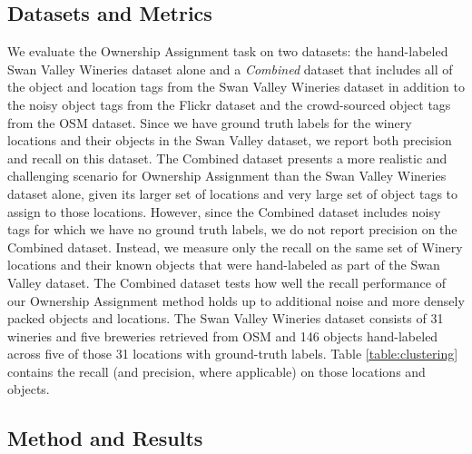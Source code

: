 \subsection{Datasets and Metrics}

We evaluate the Ownership Assignment task on two datasets: the hand-labeled Swan Valley Wineries dataset alone and a \textit{Combined} dataset that includes all of the object and location tags from the Swan Valley Wineries dataset in addition to the noisy object tags from the Flickr dataset and the crowd-sourced object tags from the OSM dataset.
Since we have ground truth labels for the winery locations and their objects in the Swan Valley dataset, we report both precision and recall on this dataset.
The Combined dataset presents a more realistic and challenging scenario for Ownership Assignment than the Swan Valley Wineries dataset alone, given its larger set of locations and very large set of object tags to assign to those locations. However, since the Combined dataset includes noisy tags for which we have no ground truth labels, we do not report precision on the Combined dataset. Instead, we measure only the recall on the same set of Winery locations and their known objects that were hand-labeled as part of the Swan Valley dataset. The Combined dataset tests how well the recall performance of our Ownership Assignment method holds up to additional noise and more densely packed objects and locations.
The Swan Valley Wineries dataset consists of 31 wineries and five breweries retrieved from OSM and 146 objects hand-labeled across five of those 31 locations with ground-truth labels. Table \ref{table:clustering} contains the recall (and precision, where applicable) on those locations and objects.


\subsection{Method and Results}

